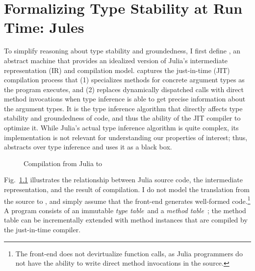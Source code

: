 \chapter{Formalizing Type Stability at Run Time: Jules}\label{sec:jules}
\label{chap:jules}

\renewcommand{\v}{\var}

To simplify reasoning about type stability and groundedness, I first
define \jules, an abstract machine that provides an idealized version of
Julia's intermediate representation (IR) and compilation model.
\jules captures the just-in-time (JIT) compilation process that (1) specializes methods
for concrete argument types as the program executes, and (2) replaces dynamically
dispatched calls with direct method invocations when type inference
is able to get precise information about the argument types.
It is the type inference algorithm that directly affects
type stability and groundedness of code, and thus the ability of the JIT compiler
to optimize it. While Julia's actual type inference algorithm
is quite complex, its implementation is not relevant for understanding
our properties of interest; thus, \jules abstracts over type inference
and uses it as a black box.

\begin{figure}[h]
  \caption{Compilation from Julia to \jules}\label{comp}
\end{figure}

Fig.~\ref{comp} illustrates the relationship between Julia source code, the
\jules intermediate representation, and the result of compilation. I do not model
the translation from the source to \jules, and simply assume that the front-end
generates well-formed \jules code.\footnote{The front-end does not devirtualize
function calls, as Julia programmers do not have the ability to write direct
method invocations in the source.} A \jules program consists of an immutable \emph{type
table}~\tytbl and a \emph{method table}~\mtbl; the method table can be incrementally extended
with method instances that are compiled by the just-in-time compiler.

